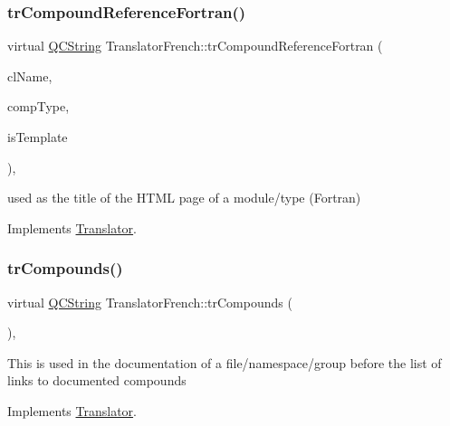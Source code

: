 \subsubsection{\texorpdfstring{trCompoundReferenceFortran()}{trCompoundReferenceFortran()}}
{\footnotesize\ttfamily virtual \mbox{\hyperlink{class_q_c_string}{Q\+C\+String}} Translator\+French\+::tr\+Compound\+Reference\+Fortran (\begin{DoxyParamCaption}\item[{const char $\ast$}]{cl\+Name,  }\item[{\mbox{\hyperlink{class_class_def_ae70cf86d35fe954a94c566fbcfc87939}{Class\+Def\+::\+Compound\+Type}}}]{comp\+Type,  }\item[{bool}]{is\+Template }\end{DoxyParamCaption})\hspace{0.3cm}{\ttfamily [inline]}, {\ttfamily [virtual]}}

used as the title of the H\+T\+ML page of a module/type (Fortran) 

Implements \mbox{\hyperlink{class_translator}{Translator}}.

\mbox{\label{class_translator_french_a895685ff98c260f672cda756de2e1cfc}} 
\subsubsection{\texorpdfstring{trCompounds()}{trCompounds()}}
{\footnotesize\ttfamily virtual \mbox{\hyperlink{class_q_c_string}{Q\+C\+String}} Translator\+French\+::tr\+Compounds (\begin{DoxyParamCaption}{ }\end{DoxyParamCaption})\hspace{0.3cm}{\ttfamily [inline]}, {\ttfamily [virtual]}}

This is used in the documentation of a file/namespace/group before the list of links to documented compounds 

Implements \mbox{\hyperlink{class_translator}{Translator}}.

\mbox{\label{class_translator_french_aa54b61067736039ebb3d9d62b927c9c5}} 
